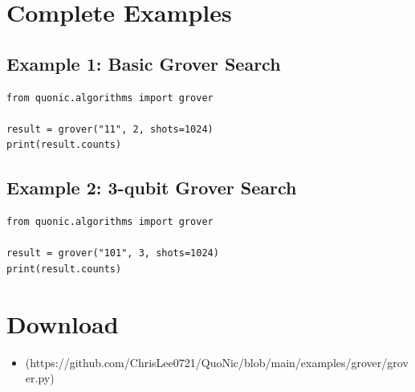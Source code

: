 \documentclass[12pt,a4paper]{article}
\begin{document}
\section{Complete Examples}

\subsection{Example 1: Basic Grover Search}

\begin{verbatim}
from quonic.algorithms import grover

result = grover("11", 2, shots=1024)
print(result.counts)
\end{verbatim}

\subsection{Example 2: 3-qubit Grover Search}

\begin{verbatim}
from quonic.algorithms import grover

result = grover("101", 3, shots=1024)
print(result.counts)
\end{verbatim}

\section{Download}

\begin{itemize}
  \item [grover.py](https://github.com/ChrisLee0721/QuoNic/blob/main/examples/grover/grover.py)
\end{itemize}
\end{document}
